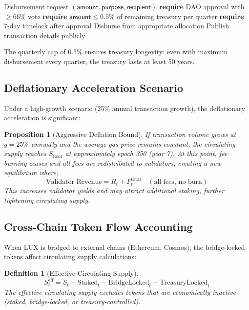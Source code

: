 \documentclass[11pt,a4paper]{article}
\newtheorem{proposition}[theorem]{Proposition}
\newtheorem{definition}{Definition}
\begin{document}
\begin{algorithm}[H]
\caption{Treasury Disbursement Protocol}
\label{alg:treasury}
\begin{algorithmic}[1]
\Require Disbursement request $(\mathsf{amount}, \mathsf{purpose}, \mathsf{recipient})$
\State \textbf{require} DAO approval with $\geq 66\%$ vote
\State \textbf{require} $\mathsf{amount} \leq 0.5\%$ of remaining treasury per quarter
\State \textbf{require} 7-day timelock after approval
\State Disburse from appropriate allocation
\State Publish transaction details publicly
\end{algorithmic}
\end{algorithm}

The quarterly cap of 0.5\% ensures treasury longevity: even with maximum disbursement every quarter, the treasury lasts at least 50 years.

\subsection{Deflationary Acceleration Scenario}

Under a high-growth scenario (25\% annual transaction growth), the deflationary acceleration is significant:

\begin{proposition}[Aggressive Deflation Bound]
If transaction volume grows at $g = 25\%$ annually and the average gas price remains constant, the circulating supply reaches $S_{\text{floor}}$ at approximately epoch 350 (year 7). At this point, fee burning ceases and all fees are redistributed to validators, creating a new equilibrium where:
\begin{equation}
    \text{Validator Revenue} = R_t + F_t^{\text{total}} \quad (\text{all fees, no burn})
\end{equation}
This increases validator yields and may attract additional staking, further tightening circulating supply.
\end{proposition}

\subsection{Cross-Chain Token Flow Accounting}

When LUX is bridged to external chains (Ethereum, Cosmos), the bridge-locked tokens affect circulating supply calculations:

\begin{definition}[Effective Circulating Supply]
\begin{equation}
    S_t^{\text{eff}} = S_t - \text{Staked}_t - \text{BridgeLocked}_t - \text{TreasuryLocked}_t
\end{equation}
The effective circulating supply excludes tokens that are economically inactive (staked, bridge-locked, or treasury-controlled).
\end{definition}
\end{document}
